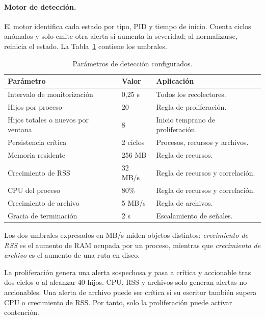 \paragraph{Motor de detección.}

El motor identifica cada estado por tipo, PID y tiempo de inicio. Cuenta ciclos
anómalos y solo emite otra alerta si aumenta la severidad; al normalizarse,
reinicia el estado. La Tabla~\ref{tab:umbrales} contiene los umbrales.

\begin{table}[H]
  \centering
  \small
  \caption{Parámetros de detección configurados.}
  \label{tab:umbrales}
  \begin{tabular}{p{}p{}p{}}
    \toprule
    \textbf{Parámetro} & \textbf{Valor} & \textbf{Aplicación} \\
    \midrule
    Intervalo de monitorización & 0,25 s & Todos los recolectores. \\
    Hijos por proceso & 20 & Regla de proliferación. \\
    Hijos totales o nuevos por ventana & 8 & Inicio temprano de proliferación. \\
    Persistencia crítica & 2 ciclos & Procesos, recursos y archivos. \\
    Memoria residente & 256 MB & Regla de recursos. \\
    Crecimiento de RSS & 32 MB/s & Regla de recursos y correlación. \\
    CPU del proceso & 80\% & Regla de recursos y correlación. \\
    Crecimiento de archivo & 5 MB/s & Regla de archivos. \\
    Gracia de terminación & 2 s & Escalamiento de señales. \\
    \bottomrule
  \end{tabular}
\end{table}

Los dos umbrales expresados en MB/s miden objetos distintos:
\emph{crecimiento de RSS} es el aumento de RAM ocupada por un proceso, mientras
que \emph{crecimiento de archivo} es el aumento de una ruta en disco.

La proliferación genera una alerta sospechosa y pasa a crítica y accionable tras
dos ciclos o al alcanzar 40 hijos. CPU, RSS y archivos solo generan alertas no
accionables. Una alerta de archivo puede ser crítica si su escritor también
supera CPU o crecimiento de RSS. Por tanto, solo la proliferación puede activar
contención.

